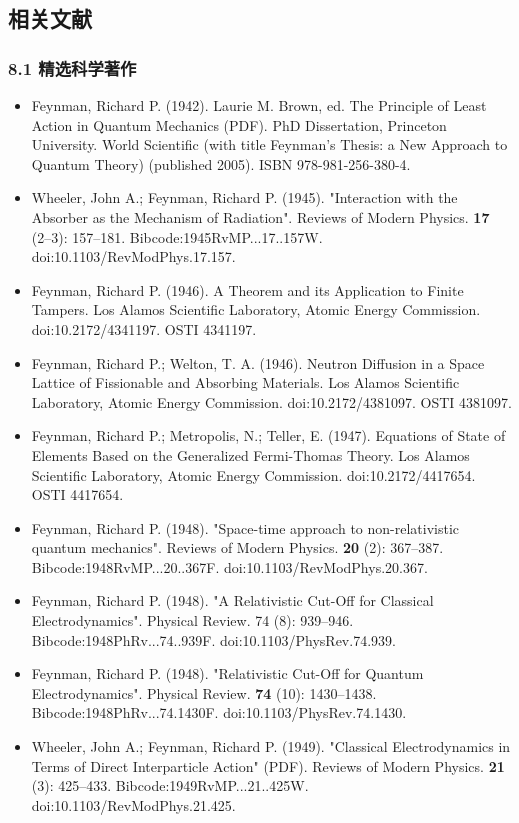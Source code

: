 \subsection{相关文献}
\subsubsection{8.1 精选科学著作}
\begin{itemize}
\item Feynman, Richard P. (1942). Laurie M. Brown, ed. The Principle of Least Action in Quantum Mechanics (PDF). PhD Dissertation, Princeton University. World Scientific (with title Feynman's Thesis: a New Approach to Quantum Theory) (published 2005). ISBN 978-981-256-380-4.
\item Wheeler, John A.; Feynman, Richard P. (1945). "Interaction with the Absorber as the Mechanism of Radiation". Reviews of Modern Physics. \textbf{17} (2–3): 157–181. Bibcode:1945RvMP...17..157W. doi:10.1103/RevModPhys.17.157.
\item Feynman, Richard P. (1946). A Theorem and its Application to Finite Tampers. Los Alamos Scientific Laboratory, Atomic Energy Commission. doi:10.2172/4341197. OSTI 4341197.
\item Feynman, Richard P.; Welton, T. A. (1946). Neutron Diffusion in a Space Lattice of Fissionable and Absorbing Materials. Los Alamos Scientific Laboratory, Atomic Energy Commission. doi:10.2172/4381097. OSTI 4381097.
\item Feynman, Richard P.; Metropolis, N.; Teller, E. (1947). Equations of State of Elements Based on the Generalized Fermi-Thomas Theory. Los Alamos Scientific Laboratory, Atomic Energy Commission. doi:10.2172/4417654. OSTI 4417654.
\item Feynman, Richard P. (1948). "Space-time approach to non-relativistic quantum mechanics". Reviews of Modern Physics. \textbf{20} (2): 367–387. Bibcode:1948RvMP...20..367F. doi:10.1103/RevModPhys.20.367.
\item Feynman, Richard P. (1948). "A Relativistic Cut-Off for Classical Electrodynamics". Physical Review. 74 (8): 939–946. Bibcode:1948PhRv...74..939F. doi:10.1103/PhysRev.74.939.
\item Feynman, Richard P. (1948). "Relativistic Cut-Off for Quantum Electrodynamics". Physical Review. \textbf{74} (10): 1430–1438. Bibcode:1948PhRv...74.1430F. doi:10.1103/PhysRev.74.1430.
\item Wheeler, John A.; Feynman, Richard P. (1949). "Classical Electrodynamics in Terms of Direct Interparticle Action" (PDF). Reviews of Modern Physics. \textbf{21} (3): 425–433. Bibcode:1949RvMP...21..425W. doi:10.1103/RevModPhys.21.425.

\end{itemize}
